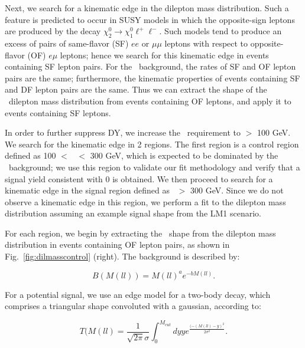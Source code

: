 Next, we search for a kinematic edge in the dilepton mass distribution. Such a feature is 
predicted to occur in SUSY models in which the opposite-sign leptons are produced by the
decay $\chi_2^0 \to \chi_1^0 \ell^+\ell^-$. Such models tend to produce an excess of pairs 
of same-flavor (SF) $ee$ or $\mu\mu$ leptons with respect to opposite-flavor (OF) $e\mu$
leptons; hence we search for this kinematic edge in events containing SF lepton pairs. 
For the \ttbar\ background, the rates of SF and OF lepton pairs are the same;
furthermore, the kinematic properties of events containing SF and DF lepton pairs are the
same. Thus we can extract the shape of the \ttbar\ dilepton mass distribution from events 
containing OF leptons, and apply it to events containing SF leptons.

In order to further suppress DY, we increase the \MET\ requirement to \MET $>$ 100 GeV. 
We search for the kinematic edge in 2 regions.  The first region is a control region defined
as 100 $<$ \Ht\ $<$ 300 GeV, which is expected to be dominated by the \ttbar\ background; we use 
this region to validate our fit methodology and verify that a signal yield consistent with 0 
is obtained. We then proceed to search for a kinematic edge in the signal region defined as 
\Ht\ $>$ 300 GeV. Since we do not observe a kinematic edge in this region, we perform a 
fit to the dilepton mass distribution assuming an example signal shape from the LM1 scenario.

For each region, we begin by extracting the \ttbar\ shape from the dilepton mass distribution 
in events containing OF lepton pairs, as shown in Fig.~\ref{fig:dilmasscontrol} (right). 
The background is described by:

\begin{equation}
B(M(ll)) = M(ll)^a e^{-b M(ll)}.
\end{equation}

For a potential signal, we use an edge model for a two-body decay, which comprises a triangular shape convoluted with a gaussian,
according to:

\begin{equation}
T(M(ll) = \frac{1}{\sqrt{2\pi}\sigma}\int_0^{M_{cut}} dy y e^{\frac{(-(M(ll)-y)^2}{2\sigma^2}}. 
\end{equation}


